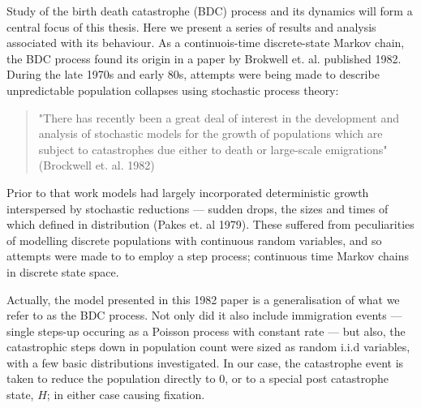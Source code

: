 \noindent
Study of the birth death catastrophe (BDC) process and its dynamics will form a central focus of this thesis. Here
we present a series of results and analysis associated with its behaviour. As a continuois-time discrete-state Markov chain, 
the BDC process found its origin in a paper by Brokwell et. al. published 1982. During the late 1970s and early 80s,
attempts were being made to describe unpredictable population collapses using stochastic process theory:
\begin{quotation}
    "There has recently been a great deal of interest in the development and
    analysis of stochastic models for the growth of populations which are subject to
    catastrophes due either to death or large-scale emigrations" (Brockwell et. al. 1982)
\end{quotation}
Prior to that work models had largely incorporated deterministic growth interspersed by stochastic reductions --- sudden
drops, the sizes and times of which defined in distribution (Pakes et. al 1979). These suffered from peculiarities of 
modelling discrete populations with continuous random variables, and so attempts were made to to employ a step process; 
continuous time Markov chains in discrete state space.\par

Actually, the model presented in this 1982 paper is a generalisation of what we refer to as the BDC process. Not only
did it also include immigration events --- single steps-up occuring as a Poisson process with constant rate --- but also, the
catastrophic steps down in population count were sized as random i.i.d variables, with a few basic distributions investigated.
In our case, the catastrophe event is taken to reduce the population directly to 0, or to a special post catastrophe state,
$H$; in either case causing fixation.


